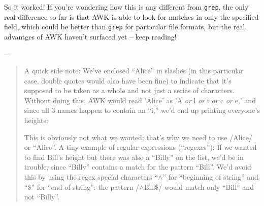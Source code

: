 \documentclass[10pt,a4]{article}
\begin{document}
\ttfamily
\colorbox{black}{}
\normalfont

So it worked! If you're wondering how this is any different from \texttt{grep}, the only real difference so far is that AWK is able to look for matches in only the specified field, which could be better than \texttt{grep} for particular file formats, but the real advantges of AWK haven't surfaced yet -- keep reading!

---

\begin{quote}

A quick side note: We've enclosed ``Alice'' in slashes (in this particular case, double quotes would also have been fine) to indicate that it's supposed to be taken as a whole and not just a series of characters. Without doing this, AWK would read 'Alice' as 'A \textit{or} l \textit{or} i \textit{or} c \textit{or} e,' and since all 3 names happen to contain an ``i,'' we'd end up printing everyone's heights:

\ttfamily
\colorbox{black}{}
\normalfont

This is obviously not what we wanted; that's why we need to use /Alice/ or ``Alice''. A tiny example of regular expressions (``regexes''): If we wanted to find Bill's height but there was also a ``Billy'' on the list, we'd be in trouble, since ``Billy'' contains a match for the pattern ``Bill''. We'd avoid this by using the regex special characters ``$\wedge$'' for ``beginning of string'' and ``\$'' for ``end of string'': the pattern /$\wedge$Bill\$/ would match only ``Bill'' and not ``Billy''.

\end{quote}
\end{document}
